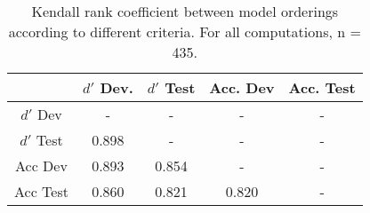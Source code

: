 \begin{centering}
\begin{table}[t]
\scriptsize
\vspace{-0.2cm}
\caption{Kendall rank coefficient between model orderings according to different criteria. For all computations, n = 435.}\label{tab:kendeltau}
\vspace{-2mm}
\centering
\begin{tabular}{@{} c|cccc @{}}
           & $d'$ Dev. & $d'$ Test      & Acc. Dev & Acc. Test \\
\midrule
$d'$ Dev  &   -         &     -        &    -     &     -    \\
$d'$ Test &   0.898     &     -        &  -       &    -      \\
Acc Dev &   0.893     &   0.854      &   -      &    -      \\
Acc Test&   0.860     &   0.821      &  0.820   &    -      \\
\midrule
\end{tabular}
\vspace{-5mm}
\end{table}
\end{centering}